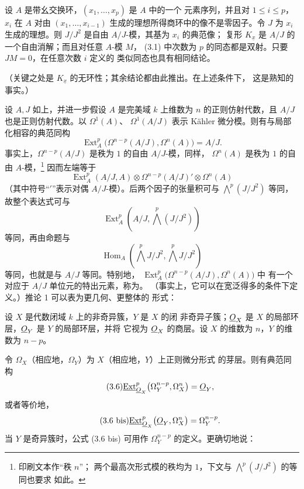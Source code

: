  设 $A$ 是带幺交换环，$(x_1,\ldots,x_p)$ 是 $A$ 中的一个
元素序列，并且对 $1\leq i\leq p$，$x_i$ 在 $A$ 对由
$(x_1,\ldots,x_{i-1})$ 生成的理想所得商环中的像不是零因子。令 $J$ 为
$x_i$ 生成的理想。则 $J/J^{2}$ 是自由 $A/J$-模，其基为 $x_i$ 的典范像；
复形 $K_{\underline{x}}$ 是 $A/J$ 的一个自由消解；而且对任意 $A$-模 $M$，
(3.1) 中次数为 $p$ 的同态都是双射。只要 $J M=0$，在任意次数 $i$ 定义的
类似同态也具有相同结论。

（关键之处是 $K_{\underline{x}}$ 的无环性；其余结论都由此推出。在上述条件下，
这是熟知的事实。）

 设 $A,J$ 如上，并进一步假设 $A$ 是完美域 $k$ 上维数为
$n$ 的正则仿射代数，且 $A/J$ 也是正则仿射代数。以 $\Omega^{1}(A)$、
$\Omega^{1}(A/J)$ 表示 Kähler 微分模。则有与局部化相容的典范同构
\begin{equation}\tag{3.5}
  \operatorname{Ext}_{A}^{p}\bigl(\Omega^{n-p}(A/J),\Omega^{n}(A)\bigr)=A/J.
\end{equation}
事实上，$\Omega^{n-p}(A/J)$ 是秩为 $1$ 的自由 $A/J$-模，同样，
$\Omega^{n}(A)$ 是秩为 $1$ 的自由 $A$-模，\footnote{印刷文本作“秩 $n$”；
两个最高次形式模的秩均为 $1$，下文与 $\bigwedge^{p}(J/J^{2})$ 的等同也要求
如此。} 因而左端等于
\[
  \operatorname{Ext}_{A}^{p}(A/J,A)
  \otimes\Omega^{n-p}(A/J)'\otimes\Omega^{n}(A)
\]
（其中符号“$'$”表示对偶 $A/J$-模）。后两个因子的张量积可与
$\bigwedge^{p}(J/J^{2})$ 等同，故整个表达式可与
\[
  \operatorname{Ext}_{A}^{p}\!\left(A/J,\bigwedge^{p}(J/J^{2})\right)
\]
等同，再由命题与
\[
  \operatorname{Hom}_{A}\!\left(\bigwedge^{p}J/J^{2},
  \bigwedge^{p}J/J^{2}\right)
\]
等同，也就是与 $A/J$ 等同。特别地，
$\operatorname{Ext}_{A}^{p}\bigl(\Omega^{n-p}(A/J),\Omega^{n}(A)\bigr)$ 中
有一个对应于 $A/J$ 单位元的特出元素，称为。
（事实上，它可以在宽泛得多的条件下定义。）推论 1 可以表为更几何、更整体的
形式：

 设 $X$ 是代数闭域 $k$ 上的非奇异簇，$Y$ 是 $X$ 的闭
非奇异子簇；$\underline{O}_X$ 是 $X$ 的局部环层，$\underline{O}_Y$ 是 $Y$ 的局部环层，并将
它视为 $\underline{O}_X$ 的商层。设 $X$ 的维数为 $n$，$Y$ 的维数为 $n-p$。

令 $\Omega_X$（相应地，$\Omega_Y$）为 $X$（相应地，$Y$）上正则微分形式
的芽层。则有典范同构
\begin{equation}\tag{3.6}
  \underline{\operatorname{Ext}}_{\underline{O}_X}^{p}\bigl(\Omega_Y^{n-p},\Omega_X^{n}\bigr)=\underline{O}_Y,
\end{equation}
或者等价地，
\begin{equation}\tag{3.6 bis}
  \underline{\operatorname{Ext}}_{\underline{O}_X}^{p}\bigl(\underline{O}_Y,\Omega_X^{n}\bigr)=\Omega_Y^{n-p}.
\end{equation}
当 $Y$ 是奇异簇时，公式 (3.6 bis) 可用作 $\Omega_Y^{n-p}$ 的定义。更确切地说：

